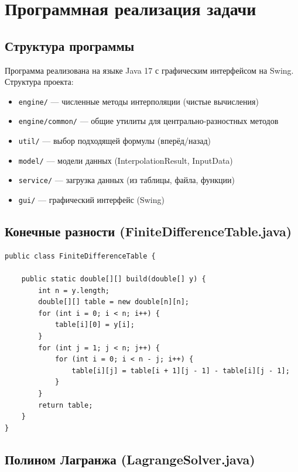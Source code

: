 \section{Программная реализация задачи}

\subsection{Структура программы}

Программа реализована на языке Java 17 с графическим интерфейсом на Swing. Структура проекта:

\begin{itemize}
\item \texttt{engine/} — численные методы интерполяции (чистые вычисления)
\item \texttt{engine/common/} — общие утилиты для центрально-разностных методов
\item \texttt{util/} — выбор подходящей формулы (вперёд/назад)
\item \texttt{model/} — модели данных (InterpolationResult, InputData)
\item \texttt{service/} — загрузка данных (из таблицы, файла, функции)
\item \texttt{gui/} — графический интерфейс (Swing)
\end{itemize}

\subsection{Конечные разности (FiniteDifferenceTable.java)}

\begin{lstlisting}[style=javaStyle, label=code:fd]
public class FiniteDifferenceTable {

    public static double[][] build(double[] y) {
        int n = y.length;
        double[][] table = new double[n][n];
        for (int i = 0; i < n; i++) {
            table[i][0] = y[i];
        }
        for (int j = 1; j < n; j++) {
            for (int i = 0; i < n - j; i++) {
                table[i][j] = table[i + 1][j - 1] - table[i][j - 1];
            }
        }
        return table;
    }
}
\end{lstlisting}

\subsection{Полином Лагранжа (LagrangeSolver.java)}

